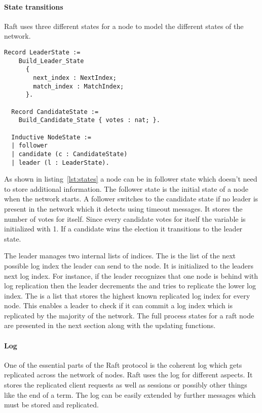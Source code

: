 \paragraph{State transitions}
Raft uses three different states for a node to model
the different states of the network.

\begin{lstlisting}[style=coq,label=lst:states,caption=The definition of the nodes states.]
 Record LeaderState :=
    Build_Leader_State
      {
        next_index : NextIndex;
        match_index : MatchIndex;
      }.

  Record CandidateState :=
    Build_Candidate_State { votes : nat; }.

  Inductive NodeState :=
  | follower
  | candidate (c : CandidateState)
  | leader (l : LeaderState).
\end{lstlisting}

As shown in listing~\ref{lst:states} a node can be in follower state which
doesn't need to store additional information. The follower state is 
the initial state of a node when the network starts. A follower switches to the
candidate state if no leader is present in the network which it detects
using timeout messages. It stores the number of votes for itself. 
Since every candidate votes for itself the  variable is initialized 
with 1. If a candidate wins the election it transitions to the leader state. 

The leader manages two internal lists of indices. The  is the
list of the next possible log index the leader can send to the node. 
It is initialized to the leaders next log index. For instance, 
if the leader recognizes that one node is behind with log replication then
the leader decrements the  and tries to replicate the lower
log index. The  is a list that stores the highest known replicated
log index for every node. This enables a leader to check if it can commit a
log index which is replicated by the majority of the network.
The full process states for a raft node are presented in the next section along
with the updating functions.

\paragraph{Log}
One of the essential parts of the Raft protocol is the coherent log which gets
replicated across the network of nodes. Raft uses the log for different aspects.
It stores the replicated client requests as well as sessions or possibly other
things like the end of a term. The log can be easily extended by further messages
which must be stored and replicated.

